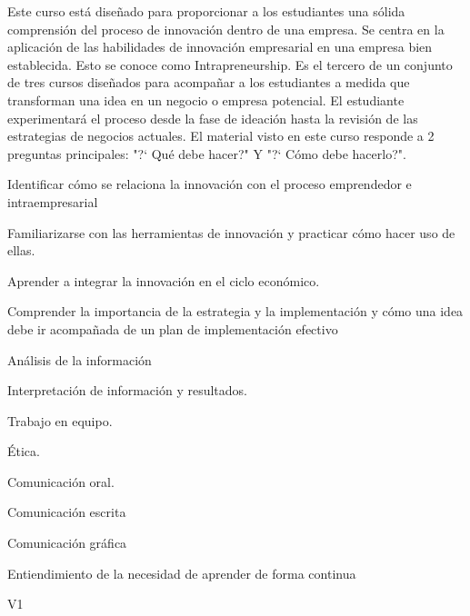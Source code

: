 \begin{syllabus}


\begin{justification}
Este curso está diseñado para proporcionar a los estudiantes una sólida comprensión del proceso de innovación dentro de una empresa. Se centra en la aplicación de las habilidades de innovación empresarial en una empresa bien establecida. Esto se conoce como Intrapreneurship.
Es el tercero de un conjunto de tres cursos diseñados para acompañar a los estudiantes a medida que transforman una idea en un negocio o empresa potencial. El estudiante experimentará el proceso desde la fase de ideación hasta la revisión de las estrategias de negocios actuales.
El material visto en este curso responde a 2 preguntas principales: "?` Qué debe hacer?" Y "?` Cómo debe hacerlo?". 

\end{justification}

\begin{goals}
\item Identificar cómo se relaciona la innovación con el proceso emprendedor e intraempresarial
\item Familiarizarse con las herramientas de innovación y practicar cómo hacer uso de ellas.
\item Aprender a integrar la innovación en el ciclo económico.
\item Comprender la importancia de la estrategia y la implementación y cómo una idea debe ir acompañada de un plan de implementación efectivo
\item Análisis de la información
\item Interpretación de información y resultados.
\item Trabajo en equipo.
\item Ética.
\item Comunicación oral.
\item Comunicación escrita
\item Comunicación gráfica
\item Entiendimiento de la necesidad de aprender de forma continua
\end{goals}

\begin{outcomes}{V1}
    \item {} %
    \item {} %
    \item {} %
    \item {} %
    \item {} %
\end{outcomes}


\end{syllabus}
